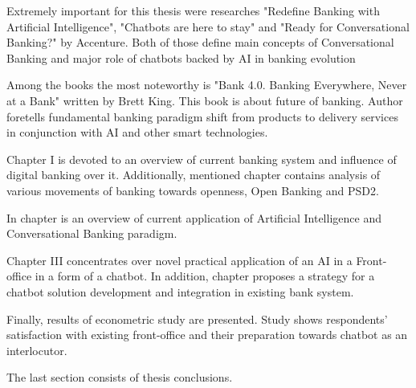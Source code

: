 Extremely important for this thesis were researches "Redefine Banking with Artificial Intelligence", "Chatbots are here to stay" and "Ready for Conversational Banking?" by Accenture.
Both of those define main concepts of Conversational Banking and major role of chatbots backed by AI in banking evolution 

Among the books the most noteworthy is "Bank 4.0. Banking Everywhere, Never at a Bank" written by Brett King.
This book is about future of banking.
Author foretells fundamental banking paradigm shift from products to delivery services in conjunction with AI and other smart technologies.

Chapter I is devoted to an overview of current banking system and influence of digital banking over it.
Additionally, mentioned chapter  contains analysis of various movements of banking towards openness, Open Banking and PSD2.

In chapter  is an overview of current application of Artificial Intelligence and Conversational Banking paradigm.

Chapter III concentrates over novel practical application of an AI in a Front-office in a form of a chatbot.
In addition, chapter  proposes a strategy for a chatbot solution development and integration in existing bank system.

Finally, results of econometric study are presented. 
Study shows respondents' satisfaction with existing front-office and their preparation towards chatbot as an interlocutor.

The last section consists of thesis conclusions. 
